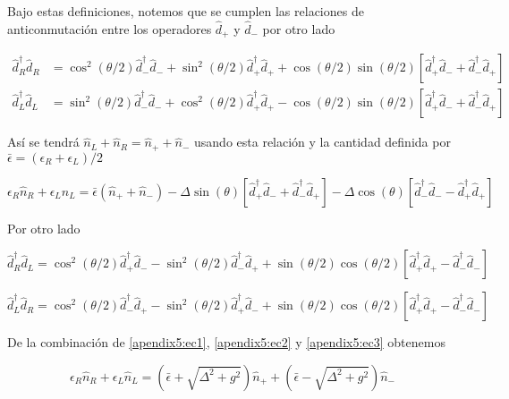 \begin{appendixs}
Bajo estas definiciones, notemos que se cumplen las relaciones de anticonmutación entre los operadores $\hat{d}_{+}$ y $\hat{d}_{-}$ por otro lado

\begin{align*}
    \hat{d}^{\dagger}_{R}\hat{d}_{R} & = \cos^{2}(\theta/2) \hat{d}^{\dagger}_{-}\hat{d}_{-} + \sin^{2}(\theta/2) \hat{d}^{\dagger}_{+}\hat{d}_{+} + \cos(\theta/2)\sin(\theta/2)[\hat{d}^{\dagger}_{+}\hat{d}_{-} + \hat{d}^{\dagger}_{-}\hat{d}_{+} ] \\
    \hat{d}^{\dagger}_{L}\hat{d}_{L} & = \sin^{2}(\theta/2) \hat{d}^{\dagger}_{-}\hat{d}_{-} + \cos^{2}(\theta/2) \hat{d}^{\dagger}_{+}\hat{d}_{+} - \cos(\theta/2)\sin(\theta/2)[\hat{d}^{\dagger}_{+}\hat{d}_{-} + \hat{d}^{\dagger}_{-}\hat{d}_{+} ]
\end{align*}

Así se tendrá $\hat{n}_{L} + \hat{n}_{R} = \hat{n}_{+} + \hat{n}_{-}$ usando esta relación y la cantidad definida por $\bar{\epsilon} = (\epsilon_{R} + \epsilon_{L})/2$ 

\begin{equation}
    \epsilon_{R} \hat{n}_{R} + \epsilon_{L} \hat{n}_{L}  = \bar{\epsilon}( \hat{n}_{+} + \hat{n}_{-} ) - \Delta \sin(\theta) [\hat{d}^{\dagger}_{+}\hat{d}_{-} + \hat{d}^{\dagger}_{-}\hat{d}_{+}] - \Delta \cos(\theta) [\hat{d}^{\dagger}_{-}\hat{d}_{-} - \hat{d}^{\dagger}_{+}\hat{d}_{+}]
\label{apendix5:ec1}
\end{equation}

Por otro lado 

\begin{equation}
    \hat{d}^{\dagger}_{R}\hat{d}_{L} = \cos^{2}(\theta/2)\hat{d}^{\dagger}_{+}\hat{d}_{-} - \sin^{2}(\theta/2) \hat{d}^{\dagger}_{-}\hat{d}_{+}  + \sin(\theta/2)\cos(\theta/2)[ \hat{d}^{\dagger}_{+}\hat{d}_{+} - \hat{d}^{\dagger}_{-}\hat{d}_{-} ]
    \label{apendix5:ec2}
\end{equation}

\begin{equation}
    \hat{d}^{\dagger}_{L}\hat{d}_{R} = \cos^{2}(\theta/2)\hat{d}^{\dagger}_{-}\hat{d}_{+} - \sin^{2}(\theta/2) \hat{d}^{\dagger}_{+}\hat{d}_{-}  + \sin(\theta/2)\cos(\theta/2)[ \hat{d}^{\dagger}_{+}\hat{d}_{+} - \hat{d}^{\dagger}_{-}\hat{d}_{-} ]
    \label{apendix5:ec3}
\end{equation}

De la combinación de \ref{apendix5:ec1}, \ref{apendix5:ec2} y \ref{apendix5:ec3} obtenemos

\begin{equation*}
    \epsilon_{R} \hat{n}_{R} + \epsilon_{L} \hat{n}_{L} = (\bar{\epsilon} + \sqrt{\Delta^{2} + g^{2}})\hat{n}_{+} +  (\bar{\epsilon} - \sqrt{\Delta^{2} + g^{2}})\hat{n}_{-}
\end{equation*}


\end{appendixs}
